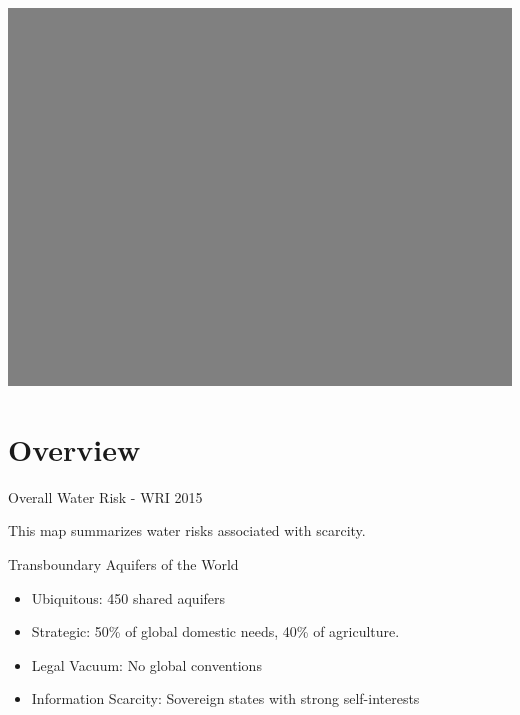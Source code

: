 \documentclass[compress,english]{beamer}
\begin{document}
{\usebackgroundtemplate%
	{\includegraphics[height=\paperheight]{background_grey.png}}
\section{Overview}
}

\begin{frame}{Overall Water Risk - WRI 2015}

\begin{center}
\end{center}
This map summarizes water risks associated with scarcity.
\end{frame}

\begin{frame}{Transboundary Aquifers of the World}

\begin{center}
\end{center}
\begin{itemize}
\item Ubiquitous: 450 shared aquifers
\item Strategic: 50\% of global domestic needs, 40\% of agriculture.
\item Legal Vacuum: No global conventions
\item Information Scarcity: Sovereign states with strong self-interests
\end{itemize}

\end{frame}
\end{document}
